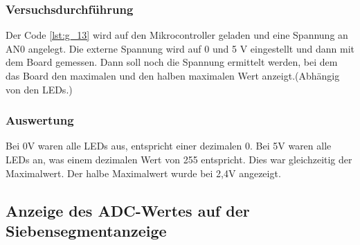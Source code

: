 \documentclass[12pt,a4paper]{article}
\begin{document}
\subsubsection*{Versuchsdurchführung}

Der Code \ref{lst:g_13} wird auf den Mikrocontroller geladen und eine Spannung an AN0 angelegt. Die externe Spannung wird auf 0 und 5 V eingestellt und dann mit dem Board gemessen. Dann soll noch die Spannung ermittelt werden, bei dem das  Board den maximalen und den halben maximalen Wert anzeigt.(Abhängig von den LEDs.)


\subsubsection*{Auswertung}

Bei 0V waren alle LEDs aus, entspricht einer dezimalen 0. Bei 5V waren alle LEDs an, was einem dezimalen Wert von 255 entspricht. Dies war gleichzeitig der Maximalwert. Der halbe Maximalwert wurde bei 2,4V angezeigt.

\subsection{Anzeige des ADC-Wertes auf der Siebensegmentanzeige}
\end{document}
